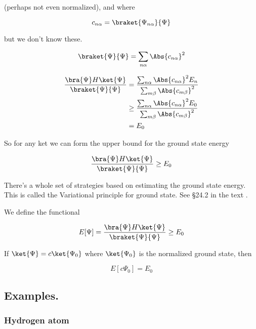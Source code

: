 (perhaps not even normalized), and where

\begin{equation}\label{eqn:qmTwoL2:110}
c_{n \alpha} = \braket{\Psi_{n \alpha}}{\Psi}
\end{equation}

but we don't know these.

\begin{equation}\label{eqn:qmTwoL2:130}
\braket{\Psi}{\Psi} = \sum_{n \alpha} \Abs{c_{n \alpha}}^2
\end{equation}

\begin{align*}
\frac{
\bra{\Psi} H \ket{\Psi}
}{
\braket{\Psi}{\Psi}
}
&=
\frac{
\sum_{n \alpha} \Abs{c_{n \alpha}}^2 E_n
}{
\sum_{m \beta} \Abs{c_{m \beta}}^2
} \\
&\ge
\frac{
\sum_{n \alpha} \Abs{c_{n \alpha}}^2 E_0
}{
\sum_{m \beta} \Abs{c_{m \beta}}^2
}  \\
&=
E_0
\end{align*}

So for any ket we can form the upper bound for the ground state energy

\begin{equation}\label{eqn:qmTwoL2:150}
\frac{
\bra{\Psi} H \ket{\Psi}
}{
\braket{\Psi}{\Psi}
}
\ge E_0
\end{equation}

There's a whole set of strategies based on estimating the ground state energy.  This is called the Variational principle for ground state.  See \S 24.2 in the text \cite{desai2009quantum}.

We define the functional

\begin{equation}\label{eqn:qmTwoL2:170}
E[\Psi] =
\frac{
\bra{\Psi} H \ket{\Psi}
}{
\braket{\Psi}{\Psi}
}
\ge E_0
\end{equation}

If $\ket{\Psi} = c \ket{\Psi_0}$ where $\ket{\Psi_0}$ is the normalized ground state, then

\begin{equation}\label{eqn:qmTwoL2:190}
E[ c \Psi_0 ] = E_0
\end{equation}

\subsection{Examples.}

\subsubsection{Hydrogen atom}


